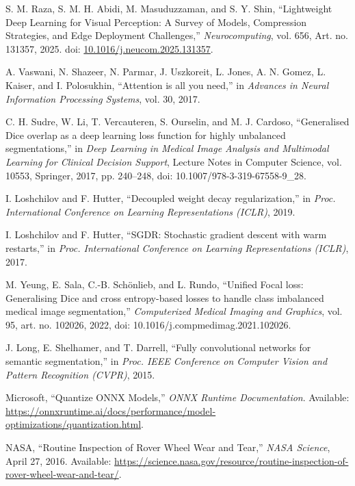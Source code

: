 S. M. Raza, S. M. H. Abidi, M. Masuduzzaman, and S. Y. Shin,
``Lightweight Deep Learning for Visual Perception: A Survey of Models,
Compression Strategies, and Edge Deployment Challenges,''
\emph{Neurocomputing}, vol. 656, Art. no. 131357, 2025.
doi: \href{https://doi.org/10.1016/j.neucom.2025.131357}
{10.1016/j.neucom.2025.131357}.

A. Vaswani, N. Shazeer, N. Parmar, J. Uszkoreit, L. Jones,
A. N. Gomez, L. Kaiser, and I. Polosukhin,
``Attention is all you need,''
in \emph{Advances in Neural Information Processing Systems},
vol. 30, 2017.

C. H. Sudre, W. Li, T. Vercauteren, S. Ourselin, and M. J. Cardoso,
``Generalised Dice overlap as a deep learning loss function for highly
unbalanced segmentations,''
in \emph{Deep Learning in Medical Image Analysis and Multimodal Learning
    for Clinical Decision Support},
Lecture Notes in Computer Science, vol. 10553,
Springer, 2017, pp. 240--248,
doi: 10.1007/978-3-319-67558-9\_28.

I. Loshchilov and F. Hutter,
``Decoupled weight decay regularization,''
in \emph{Proc. International Conference on Learning Representations
    (ICLR)}, 2019.

I. Loshchilov and F. Hutter,
``SGDR: Stochastic gradient descent with warm restarts,''
in \emph{Proc. International Conference on Learning Representations
    (ICLR)}, 2017.

M. Yeung, E. Sala, C.-B. Sch\"onlieb, and L. Rundo,
``Unified Focal loss: Generalising Dice and cross entropy-based losses
to handle class imbalanced medical image segmentation,''
\emph{Computerized Medical Imaging and Graphics},
vol. 95, art. no. 102026, 2022,
doi: 10.1016/j.compmedimag.2021.102026.

J. Long, E. Shelhamer, and T. Darrell,
``Fully convolutional networks for semantic segmentation,''
in \emph{Proc. IEEE Conference on Computer Vision and Pattern Recognition
    (CVPR)}, 2015.

Microsoft,
``Quantize ONNX Models,''
\textit{ONNX Runtime Documentation}.
Available: \url{https://onnxruntime.ai/docs/performance/model-optimizations/quantization.html}.

NASA,
``Routine Inspection of Rover Wheel Wear and Tear,''
\textit{NASA Science}, April 27, 2016.
Available:
\url{https://science.nasa.gov/resource/routine-inspection-of-rover-wheel-wear-and-tear/}.

